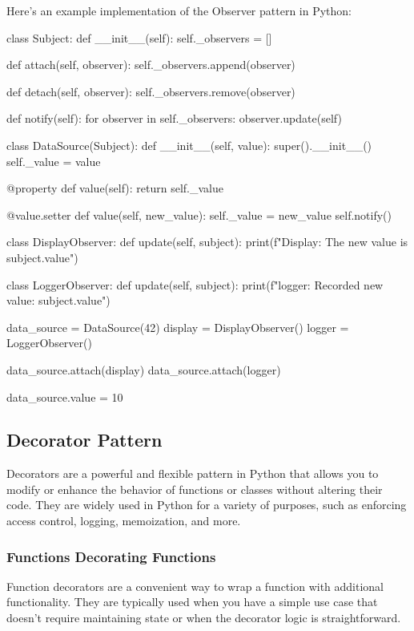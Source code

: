 \documentclass[12pt, a4paper, oneside, justified]{article}
\begin{document}
Here's an example implementation of the Observer pattern in Python:
\begin{python}
    class Subject:
        def __init__(self):
            self._observers = []

        def attach(self, observer):
            self._observers.append(observer)

        def detach(self, observer):
            self._observers.remove(observer)

        def notify(self):
            for observer in self._observers:
                observer.update(self)

    class DataSource(Subject):
        def __init__(self, value):
            super().__init__()
            self._value = value

        @property
        def value(self):
            return self._value

        @value.setter
        def value(self, new_value):
            self._value = new_value
            self.notify()

    class DisplayObserver:
        def update(self, subject):
            print(f"Display: The new value is {subject.value}")

    class LoggerObserver:
        def update(self, subject):
            print(f"logger: Recorded new value: {subject.value}")

    data_source = DataSource(42)
    display = DisplayObserver()
    logger = LoggerObserver()

    data_source.attach(display)
    data_source.attach(logger)

    data_source.value = 10
\end{python}

\subsection{Decorator Pattern}
Decorators are a powerful and flexible pattern in Python that allows you to modify or enhance
the behavior of functions or classes without altering their code. They are widely used in Python
for a variety of purposes, such as enforcing access control, logging, memoization, and more.

\subsubsection*{Functions Decorating Functions}
Function decorators are a convenient way to wrap a function with additional functionality. They
are typically used when you have a simple use case that doesn’t require maintaining state or
when the decorator logic is straightforward. 
\end{document}
